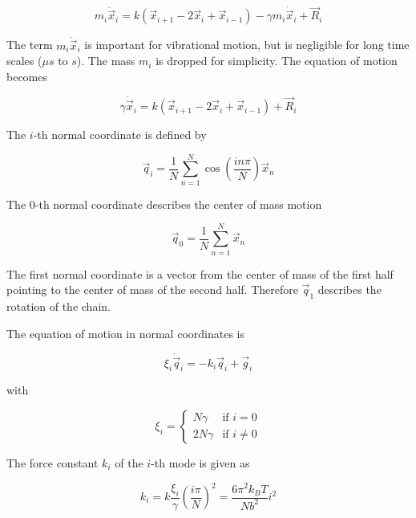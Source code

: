 \documentclass[a4paper]{article}
\begin{document}
\begin{equation}
m_i \ddot{\vec{x}}_i = k (\vec{x}_{i+1} - 2 \vec{x}_i + \vec{x}_{i-1}) - \gamma m_i \dot{\vec{x}}_i + \vec{R}_i
\end{equation}

The term $m_i \ddot{\vec{x}}_i$ is important for vibrational motion, but is negligible for long time scales ($\mu s$ to $s$). The mass $m_i$ is dropped for simplicity. The equation of motion becomes

\begin{equation}
\gamma \dot{\vec{x}}_i = k (\vec{x}_{i+1} - 2 \vec{x}_i + \vec{x}_{i-1}) + \vec{R}_i
\end{equation}

The $i$-th normal coordinate is defined by

\begin{equation}
\vec{q}_i = \frac{1}{N} \sum_{n=1}^N \cos \left( \frac{i n \pi}{N} \right) \vec{x}_n
\end{equation}

The $0$-th normal coordinate describes the center of mass motion

\begin{equation}
\vec{q}_0 = \frac{1}{N} \sum_{n=1}^N \vec{x}_n
\end{equation}

The first normal coordinate is a vector from the center of mass of the first half pointing to the center of mass of the second half. Therefore $\vec{q}_1$ describes the rotation of the chain. 

The equation of motion in normal coordinates is

\begin{equation}
\xi_i \dot{\vec{q}}_i = -k_i \vec{q}_i + \vec{g}_i
\end{equation}

with

\begin{equation}
\xi_i = \begin{cases} N \gamma &\mbox{if } i = 0 \\ 
2 N \gamma & \mbox{if } i \neq 0 \end{cases}
\end{equation}

The force constant $k_i$ of the $i$-th mode is given as

\begin{equation}
k_i = k \frac{\xi_i}{\gamma} \left( \frac{i \pi}{N} \right)^2 = \frac{6 \pi^2 k_B T}{N b^2} i^2
\end{equation}
\end{document}
